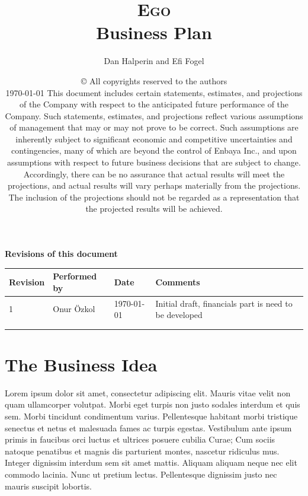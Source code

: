 \documentclass[11pt,titlepage]{article}
\begin{document}
\title{{\Huge\textsc{Ego}}\\Business Plan}
\author{Dan Halperin and Efi Fogel}
\date{\copyright{} All copyrights reserved to the authors\\\today
  \vfill This document includes certain statements, estimates, and projections of the Company with respect to the anticipated future performance of the Company. Such statements, estimates, and projections reflect various assumptions of management that may or may not prove to be correct. Such assumptions are inherently subject to significant economic and competitive uncertainties and contingencies, many of which are beyond the control of Enbaya Inc., and upon assumptions with respect to future business decisions that are subject to change. Accordingly, there can be no assurance that actual results will meet the projections, and actual results will vary perhaps materially from the projections. The inclusion of the projections should not be regarded as a representation that the projected results will be achieved.}
\thispagestyle{empty}
\maketitle
\tableofcontents
\textbf{Revisions of this document}\newline\newline\newline
\begin{tabular}{ | l | l | l | l |}\hline
  Revision & Performed by & Date & Comments \\ \hline
  1 & Onur \"Ozkol & \today & Initial draft, financials part is need to be developed\\ \hline
  & & &  \\ \hline
  & & &  \\ \hline
\end{tabular}
\section{The Business Idea}

Lorem ipsum dolor sit amet, consectetur adipiscing elit. Mauris vitae velit 
non quam ullamcorper volutpat. Morbi eget turpis non justo sodales interdum 
et quis sem. Morbi tincidunt condimentum varius. Pellentesque habitant morbi 
tristique senectus et netus et malesuada fames ac turpis egestas. Vestibulum 
ante ipsum primis in faucibus orci luctus et ultrices posuere cubilia Curae;
Cum sociis natoque penatibus et magnis dis parturient montes, nascetur 
ridiculus mus. Integer dignissim interdum sem sit amet mattis. 
Aliquam aliquam neque nec elit commodo lacinia. Nunc ut pretium lectus. 
Pellentesque dignissim justo nec mauris suscipit lobortis.\newline
\end{document}
